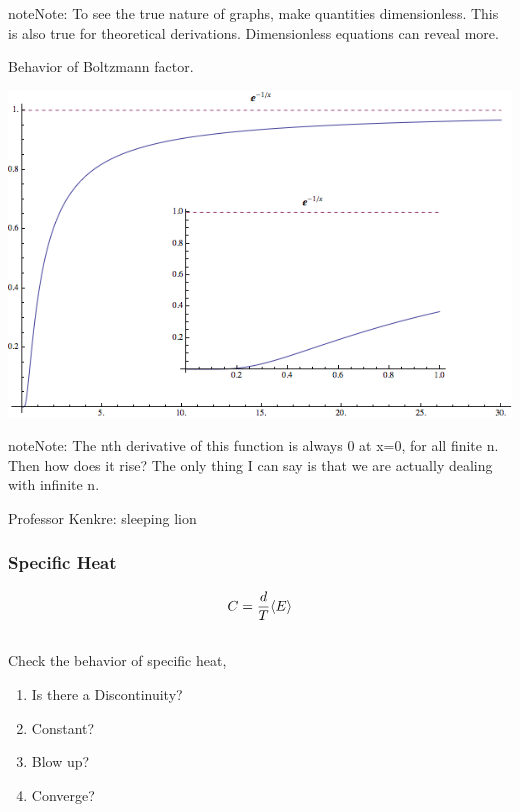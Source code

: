 \documentclass[letterpaper,10pt,english]{sphinxmanual}
\begin{document}
\begin{notice}{note}{Note:}
To see the true nature of graphs, make quantities dimensionless. This is also true for theoretical derivations. Dimensionless equations can reveal more.
\end{notice}

Behavior of Boltzmann factor.

{\hfill\includegraphics{boltzfactor.png}\hfill}

\begin{notice}{note}{Note:}
The nth derivative of this function is always 0 at x=0, for all finite n. Then how does it rise? The only thing I can say is that we are actually dealing with infinite n.

Professor Kenkre: sleeping lion
\end{notice}


\subsubsection{Specific Heat}
\label{equilibrium/week2:specific-heat}\begin{gather}
\begin{split}C = \frac{d}{T}\langle E \rangle\end{split}\notag\\\begin{split}\end{split}\notag
\end{gather}
Check the behavior of specific heat,
\begin{enumerate}
\item {} 
Is there a Discontinuity?

\item {} 
Constant?

\item {} 
Blow up?

\item {} 
Converge?

\end{enumerate}
\end{document}
